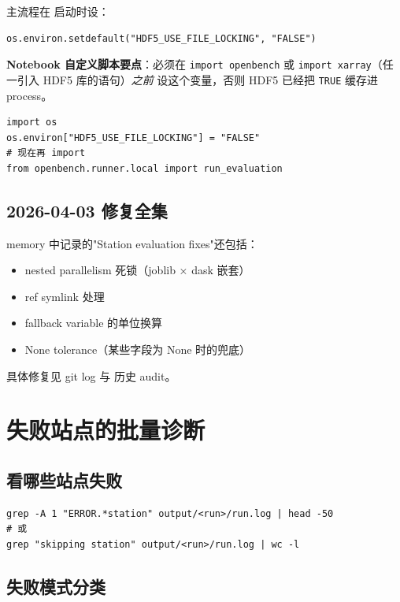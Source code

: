 主流程在  启动时设：

\begin{verbatim}
os.environ.setdefault("HDF5_USE_FILE_LOCKING", "FALSE")
\end{verbatim}

\begin{warnBox}
\textbf{Notebook 自定义脚本要点}：必须在 \texttt{import openbench} 或 \texttt{import xarray}（任一引入 HDF5 库的语句）\emph{之前} 设这个变量，否则 HDF5 已经把 \texttt{TRUE} 缓存进 process。

\begin{verbatim}
import os
os.environ["HDF5_USE_FILE_LOCKING"] = "FALSE"
# 现在再 import
from openbench.runner.local import run_evaluation
\end{verbatim}
\end{warnBox}

\subsection{2026-04-03 修复全集}

memory 中记录的"Station evaluation fixes"还包括：

\begin{itemize}
  \item nested parallelism 死锁（joblib × dask 嵌套）
  \item ref symlink 处理
  \item fallback variable 的单位换算
  \item None tolerance（某些字段为 None 时的兜底）
\end{itemize}

具体修复见 git log 与  历史 audit。

\section{失败站点的批量诊断}

\subsection{看哪些站点失败}

\begin{verbatim}
grep -A 1 "ERROR.*station" output/<run>/run.log | head -50
# 或
grep "skipping station" output/<run>/run.log | wc -l
\end{verbatim}

\subsection{失败模式分类}

